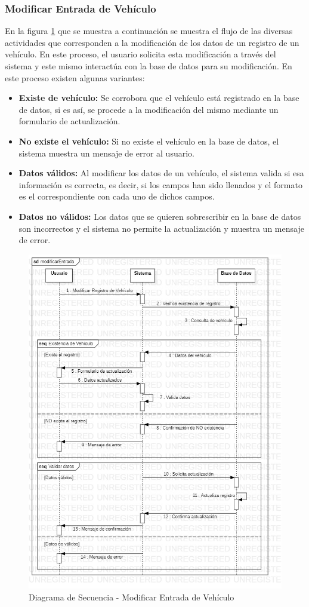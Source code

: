\subsubsection{Modificar Entrada de Vehículo}
En la figura \ref{fig:Diagrama de Secuencia - Modificar Entrada de Vehículo} que se muestra a continuación se muestra el flujo de las diversas actividades que corresponden a la modificación de los datos de un registro de un vehículo. En este proceso, el usuario solicita esta modificación a través del sistema y este mismo interactúa con la base de datos para su modificación. En este proceso existen algunas variantes:
\begin{itemize}
	\item \textbf{Existe de vehículo:} Se corrobora que el vehículo está registrado en la base de datos, si es así, se procede a la modificación del mismo mediante un formulario de actualización.
	\item \textbf{No existe el vehículo:} Si no existe el vehículo en la base de datos, el sistema muestra un mensaje de error al usuario.
	\item \textbf{Datos válidos:} Al modificar los datos de un vehículo, el sistema valida si esa información es correcta, es decir, si los campos han sido llenados y el formato es el correspondiente con cada uno de dichos campos.
	\item \textbf{Datos no válidos:} Los datos que se quieren sobrescribir en la base de datos son incorrectos y el sistema no permite la actualización y muestra un mensaje de error.
\end{itemize}
\begin{figure}[!h]
	\centering
	\includegraphics[width=1\textwidth]{./diseno/vprocesos/imagenes/modificarEntrada}
	\caption{Diagrama de Secuencia - Modificar Entrada de Vehículo}
	\label{fig:Diagrama de Secuencia - Modificar Entrada de Vehículo}
\end{figure}
\clearpage